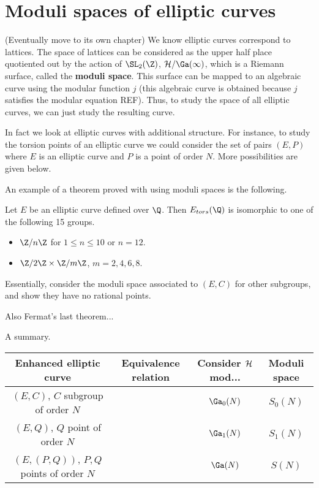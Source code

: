 \section{Moduli spaces of elliptic curves}
(Eventually move to its own chapter)
We know elliptic curves correspond to lattices. The space of lattices can be considered as the upper half place quotiented out by the action of $\SL_2(\Z)$, $\cal H/\Ga(1)$, which is a Riemann surface, called the \textbf{moduli space}. This surface can be mapped to an algebraic curve using the modular function $j$ (this algebraic curve is obtained because $j$ satisfies the modular equation REF). Thus, to study the space of all elliptic curves, we can just study the resulting curve. 

In fact we look at elliptic curves with additional structure.
For instance, to study the torsion points of an elliptic curve we could consider the set of pairs $(E,P)$ where $E$ is an elliptic curve and $P$ is a point of order $N$. More possibilities are given below.

An example of a theorem proved with using moduli spaces is the following.
\begin{thm}[Mazur]
Let $E$ be an elliptic curve defined over $\Q$. Then $E_{tors}(\Q)$ is isomorphic to one of the following 15 groups.
\begin{itemize}
\item
$\Z/n\Z$ for $1\le n\le 10$ or $n=12$.
\item
$\Z/2\Z\times \Z/m\Z$, $m=2,4,6,8$.
\end{itemize}
\end{thm}
Essentially, consider the moduli space associated to $(E,C)$ for other subgroups, and show they have no rational points.

Also Fermat's last theorem...

A summary.

\begin{tabular}{|c|c|c|c|}
\hline
Enhanced elliptic curve & Equivalence relation &Consider $\cal H$ mod...&Moduli space\\
\hline
$(E,C)$, $C$ subgroup of order $N$ & & $\Ga_0(N)$ & $S_0(N)$\\
\hline$(E,Q)$, $Q$ point of order $N$ & & $\Ga_1(N)$ & $S_1(N)$\\
\hline$(E,(P,Q))$, $P,Q$ points of order $N$& &$\Ga(N)$& $S(N)$\\
\hline
\end{tabular}

